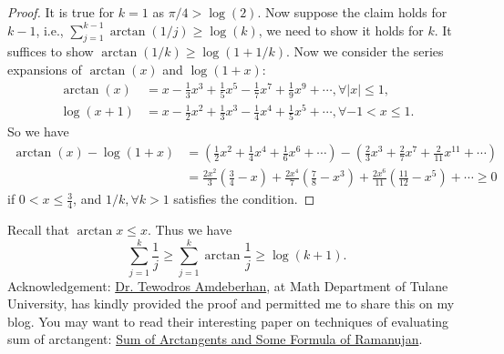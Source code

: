 \documentclass[12pt]{article}
\begin{document}
\begin{proof}
It is true for $k=1$ as $\pi/4 > \log(2)$. Now suppose the claim holds for $k-1$, i.e., $\sum_{j=1}^{k-1} \arctan\left(1/j\right) \geq \log\left(k\right)$, we need to show it holds for $k$. It suffices to show $\arctan(1/k) \geq \log\left(1+1/k\right)$. Now we consider the series expansions of $\arctan\left(x\right)$ and $\log\left(1+x\right)$: 
\begin{eqnarray*}
\arctan\left(x\right) & = x - \frac{1}{3}x^3 + \frac{1}{5}x^5 - \frac{1}{7}x^7 + \frac{1}{9}x^9 + \cdots, \forall \left|x\right|\leq 1, \\
\log\left(x+1\right) & = x - \frac{1}{2}x^2 + \frac{1}{3}x^3 - \frac{1}{4}x^4 + \frac{1}{5}x^5 + \cdots, \forall -1 < x \leq 1. 
\end{eqnarray*}
So we have
\begin{eqnarray*}
\arctan\left(x\right) - \log\left(1+x\right) & = \left(\frac{1}{2}x^2 + \frac{1}{4}x^4 + \frac{1}{6}x^6 + \cdots\right) - \left(\frac{2}{3}x^3 + \frac{2}{7}x^7 + \frac{2}{11}x^{11} + \cdots \right) \\
& = \frac{2x^2}{3}\left(\frac{3}{4}- x\right) + \frac{2x^4}{7}\left(\frac{7}{8}-x^3\right) + \frac{2x^6}{11}\left(\frac{11}{12} - x^5\right) + \cdots \geq 0
\end{eqnarray*}
if $0< x \leq \frac{3}{4}$, and $1/k, \forall k>1$ satisfies the condition.
\end{proof}

Recall that $\arctan x \leq x$. Thus we have 
\begin{equation}
\boxed{\sum_{j=1}^{k} \frac{1}{j} \geq \sum_{j=1}^{k} \arctan \frac{1}{j} \geq \log \left(k+1\right)}.
\end{equation} 
Acknowledgement: \href{http://129.81.170.14/~tamdeberhan/}{Dr. Tewodros Amdeberhan}, at Math Department of Tulane University, has kindly provided the proof and permitted me to share this on my blog. You may want to read their interesting paper on techniques of evaluating sum of arctangent: \href{http://129.81.170.14/~vhm/ac1.pdf}{Sum of Arctangents and Some Formula of Ramanujan}.  
\end{document}
